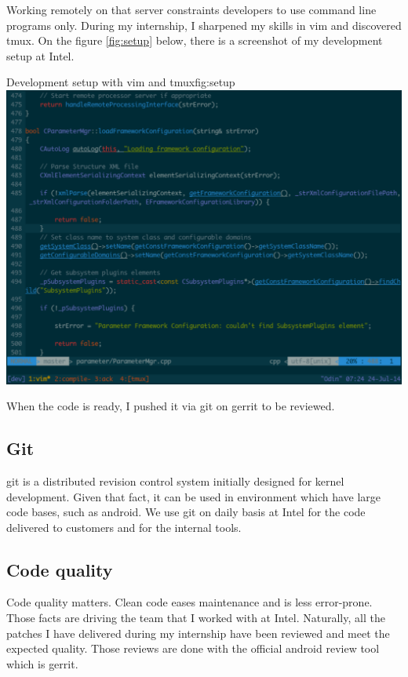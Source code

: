 Working remotely on that server constraints developers to use command line programs only.
During my internship, I sharpened my skills in \gls{vim} and discovered \gls{tmux}.
On the figure \ref{fig:setup} below, there is a screenshot of my development setup at Intel.

\begin{figureGraphics}{Development setup with vim and tmux}{fig:setup}
\includegraphics[width=\textwidth]{./src/img/setup.pdf}
\end{figureGraphics}

When the code is ready, I pushed it via \gls{git} on \gls{gerrit} to be reviewed.

\subsection{Git}
\gls{git} is a distributed revision control system initially designed for kernel
development. Given that fact, it can be used in environment which have large
code bases, such as \gls{android}. We use \gls{git} on daily basis at Intel for the
code delivered to customers and for the internal tools.

\subsection{Code quality}
Code quality matters. Clean code eases maintenance and is less error-prone.
Those facts are driving the team that I worked with at Intel. Naturally, all the
patches I have delivered during my internship have been reviewed and meet the
expected quality. Those reviews are done with the official \gls{android} review tool which is \gls{gerrit}.

